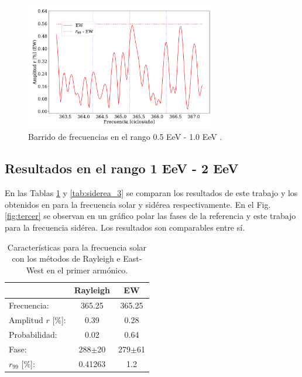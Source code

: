     \begin{figure}[H]
        \begin{small}
            \begin{center}
                \includegraphics[width=0.75\textwidth]{plot_bin_2_barrido_v3_EW.pdf}
            \end{center}
            \caption{Barrido de frecuencias en el  rango 0.5 EeV - 1.0 EeV .}
            \label{fig:segundo_barrido}
        \end{small}
    \end{figure}    


\subsection{Resultados en el rango 1 EeV - 2 EeV}

 
En las Tablas \ref{tab:solar_3} y \ref{tab:siderea_3} se comparan los resultados de este trabajo y los obtenidos en \cite{Aab_2020} para la frecuencia solar y sidérea respectivamente. En el Fig.\ref{fig:tercer} se observan en un gráfico polar las fases de la referencia y este trabajo para la frecuencia sidérea. Los resultados son comparables entre sí.
    
    \begin{table}[H]
        \begin{small}
            \begin{center}
                \begin{tabular}[c]{l|c|c}
                                    & Rayleigh      & EW            \\\hline
                    Frecuencia:     & 365.25	    & 365.25        \\
                    Amplitud $r$  [\%]:  & 0.39     & 0.28     \\
                    Probabilidad:   & 0.02          & 0.64          \\
                    Fase:           & 288$\pm$20    & 279$\pm$61    \\
                    $r_{99}$ [\%]:  & 0.41263       & 1.2       \\
                \end{tabular}
            \end{center}
        \end{small}
        \caption{Características para la frecuencia solar con los métodos de Rayleigh  e East-West en el primer armónico.}
        \label{tab:solar_3}
    \end{table}

